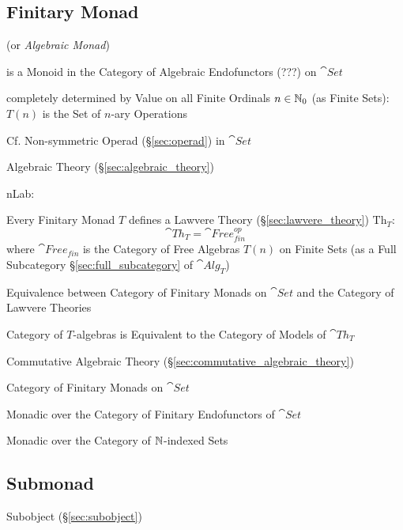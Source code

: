 \subsection{Finitary Monad}\label{sec:finitary_monad}

(or \emph{Algebraic Monad})

is a Monoid in the Category of Algebraic Endofunctors (???) on
$\cat{Set}$

completely determined by Value on all Finite Ordinals $n \in \mathbb{N}_0$
(as Finite Sets): $T(n)$ is the Set of $n$-ary Operations

\fist Cf. Non-symmetric Operad (\S\ref{sec:operad}) in
$\cat{Set}$


\asterism


Algebraic Theory (\S\ref{sec:algebraic_theory})

nLab:

Every Finitary Monad $T$ defines a Lawvere Theory
(\S\ref{sec:lawvere_theory}) $\mathrm{Th}_T$:
\[
  \cat{Th}_T = \cat{Free}^{op}_{fin}
\]
where $\cat{Free}_{fin}$ is the Category of Free Algebras $T(n)$ on
Finite Sets (as a Full Subcategory \S\ref{sec:full_subcategory} of
$\cat{Alg}_T$) %

Equivalence between Category of Finitary Monads on $\cat{Set}$ and the
Category of Lawvere Theories %

Category of $T$-algebras is Equivalent to the Category of Models of
$\cat{Th}_T$ %

Commutative Algebraic Theory
(\S\ref{sec:commutative_algebraic_theory})

Category of Finitary Monads on $\cat{Set}$

Monadic over the Category of Finitary Endofunctors of $\cat{Set}$

Monadic over the Category of $\mathbb{N}$-indexed Sets



\subsection{Submonad}\label{sec:submonad}

Subobject (\S\ref{sec:subobject})



